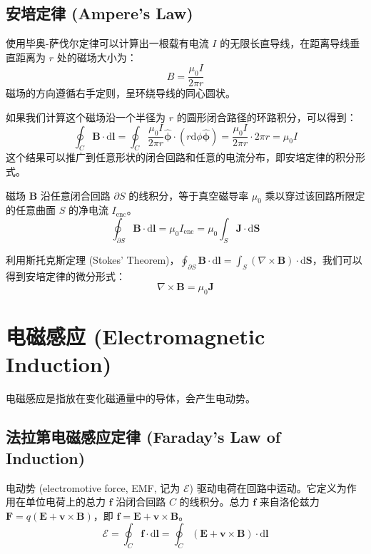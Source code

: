 \documentclass[fontset=none]{ctexart}
\begin{document}
\subsection{安培定律 (Ampere's Law)}
\begin{example}[无限长直导线的磁场]
    使用毕奥-萨伐尔定律可以计算出一根载有电流 $I$ 的无限长直导线，在距离导线垂直距离为 $r$ 处的磁场大小为：
    \begin{equation}
        B = \frac{\mu_0 I}{2\pi r}
    \end{equation}
    磁场的方向遵循右手定则，呈环绕导线的同心圆状。
\end{example}
如果我们计算这个磁场沿一个半径为 $r$ 的圆形闭合路径的环路积分，可以得到：
\begin{equation}
    \oint_C \bm{B} \cdot \mathrm{d}\bm{l} = \oint_C \frac{\mu_0 I}{2\pi r} \hat{\bm{\phi}} \cdot (r \mathrm{d}\phi \hat{\bm{\phi}}) = \frac{\mu_0 I}{2\pi r} \cdot 2\pi r = \mu_0 I
\end{equation}
这个结果可以推广到任意形状的闭合回路和任意的电流分布，即安培定律的积分形式。
\begin{definition}[安培定律]
    磁场 $\bm{B}$ 沿任意闭合回路 $\partial S$ 的线积分，等于真空磁导率 $\mu_0$ 乘以穿过该回路所限定的任意曲面 $S$ 的净电流 $I_{\text{enc}}$。
    \begin{equation}
        \oint_{\partial S} \bm{B} \cdot \mathrm{d}\bm{l} = \mu_0 I_{\text{enc}} = \mu_0 \int_S \bm{J} \cdot \mathrm{d}\bm{S}
    \end{equation}
\end{definition}
利用斯托克斯定理 (Stokes' Theorem)，$\oint_{\partial S} \bm{B} \cdot \mathrm{d}\bm{l} = \int_S (\nabla \times \bm{B}) \cdot \mathrm{d}\bm{S}$，我们可以得到安培定律的微分形式：
\begin{equation}
    \nabla \times \bm{B} = \mu_0 \bm{J}
\end{equation}

\section{电磁感应 (Electromagnetic Induction)}
电磁感应是指放在变化磁通量中的导体，会产生电动势。

\subsection{法拉第电磁感应定律 (Faraday's Law of Induction)}
\begin{definition}[电动势]
    电动势 (electromotive force, EMF, 记为 $\mathcal{E}$) 驱动电荷在回路中运动。它定义为作用在单位电荷上的总力 $\bm{f}$ 沿闭合回路 $C$ 的线积分。总力 $\bm{f}$ 来自洛伦兹力 $\bm{F} = q(\bm{E} + \bm{v} \times \bm{B})$，即 $\bm{f} = \bm{E} + \bm{v} \times \bm{B}$。
    \begin{equation}
        \mathcal{E} = \oint_C \bm{f} \cdot \mathrm{d}\bm{l} = \oint_C (\bm{E} + \bm{v} \times \bm{B}) \cdot \mathrm{d}\bm{l}
    \end{equation}
\end{definition}
\end{document}
